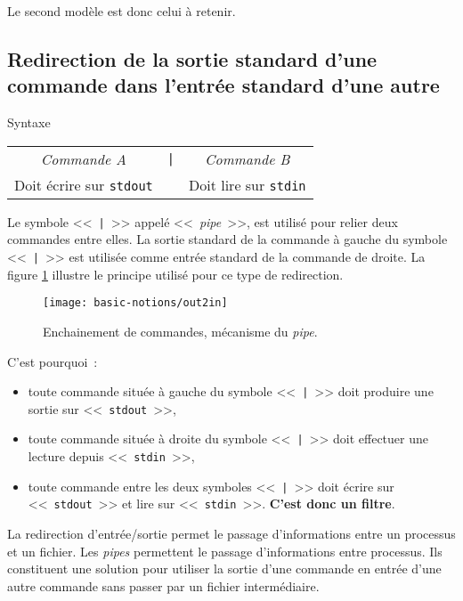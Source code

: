 \begin{remarque}
Le second mod{\`e}le est donc celui {\`a} retenir.

\subsection{Redirection de la sortie standard d'une commande dans
		l'entr{\'e}e standard d'une autre}

\begin{definition}{Syntaxe}
\begin{tabular}{ccc}
	\textsl{Commande A}				&	\texttt{|}	&	\textsl{Commande B}	\\
	Doit {\'e}crire sur \texttt{stdout}	&			&	Doit lire sur \texttt{stdin}\\
\end{tabular}
\end{definition}

Le symbole <<~\texttt{|}~>> appel{\'e} <<~\textsl{pipe}~>>, est
utilis{\'e} pour relier deux commandes entre elles. La
sortie standard de la
commande {\`a} gauche du symbole <<~\texttt{|}~>> est utilis{\'e}e comme
entr{\'e}e standard de
la commande de droite. La figure \ref{fig-basnot-out2in} illustre le
principe utilis{\'e} pour ce type de redirection.

\begin{figure}[hbtp]
	\centering
	\texttt{[image: basic-notions/out2in]}
	\caption{\label{fig-basnot-out2in}Enchainement de commandes, m{\'e}canisme du \textsl{pipe}.}
\end{figure}

C'est pourquoi~:
\begin{itemize}
	\item	toute commande situ{\'e}e {\`a} gauche du symbole <<~\texttt{|}~>> doit produire une
			sortie sur <<~\texttt{stdout}~>>,
	\item	toute commande situ{\'e}e {\`a} droite du symbole <<~\texttt{|}~>> doit effectuer une
			lecture depuis <<~\texttt{stdin}~>>,
	\item	toute commande entre les deux symboles <<~\texttt{|}~>> doit {\'e}crire sur
			<<~\texttt{stdout}~>> et lire sur <<~\texttt{stdin}~>>. {\bf C'est donc un filtre}.
\end{itemize}

La redirection d'entr{\'e}e/sortie permet le passage d'informations entre un
processus et un fichier. Les \textsl{pipes} permettent le passage d'informations
entre processus. Ils constituent une solution pour utiliser la
sortie d'une commande en entr{\'e}e d'une autre commande sans passer par un
fichier interm{\'e}diaire.


\end{remarque}
